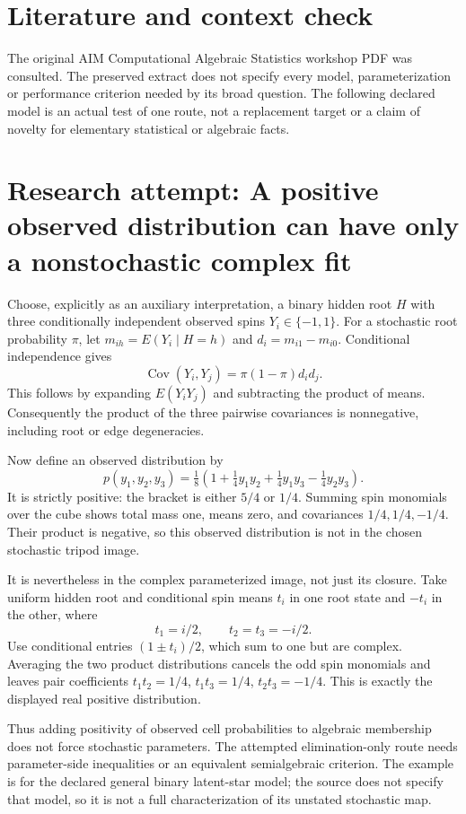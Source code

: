 \documentclass[11pt]{article}
\begin{document}
\section{Literature and context check}
The original AIM Computational Algebraic Statistics
 workshop PDF was consulted. The preserved extract does not specify every model,
 parameterization or performance criterion needed by its broad question. The
 following declared model is an actual test of one route, not a replacement
 target or a claim of novelty for elementary statistical or algebraic facts.
\section{Research attempt: A positive observed distribution can have only a nonstochastic complex fit}
Choose, explicitly as an auxiliary interpretation, a binary hidden root
$H$ with three conditionally independent observed spins $Y_i\in\{-1,1\}$.
For a stochastic root probability $\pi$, let $m_{ih}=E(Y_i\mid H=h)$ and
$d_i=m_{i1}-m_{i0}$. Conditional independence gives
\[
 \operatorname{Cov}(Y_i,Y_j)=\pi(1-\pi)d_id_j.
\]
This follows by expanding $E(Y_iY_j)$ and subtracting the product of means.
Consequently the product of the three pairwise covariances is nonnegative,
including root or edge degeneracies.

Now define an observed distribution by
\[
 p(y_1,y_2,y_3)=\tfrac18\left(1+\tfrac14y_1y_2+
                       \tfrac14y_1y_3-\tfrac14y_2y_3\right).
\]
It is strictly positive: the bracket is either $5/4$ or $1/4$.
Summing spin monomials over the cube shows total mass one, means zero,
and covariances $1/4,1/4,-1/4$. Their product is negative, so this observed
distribution is not in the chosen stochastic tripod image.

It is nevertheless in the complex parameterized image, not just its closure.
Take uniform hidden root and conditional spin means $t_i$ in one root state
and $-t_i$ in the other, where
\[
 t_1=i/2,\qquad t_2=t_3=-i/2.
\]
Use conditional entries $(1\pm t_i)/2$, which sum to one but are complex.
Averaging the two product distributions cancels the odd spin monomials and
leaves pair coefficients $t_1t_2=1/4$, $t_1t_3=1/4$, $t_2t_3=-1/4$.
This is exactly the displayed real positive distribution.

Thus adding positivity of observed cell probabilities to algebraic membership
does not force stochastic parameters. The attempted elimination-only route
needs parameter-side inequalities or an equivalent semialgebraic criterion.
The example is for the declared general binary latent-star model; the source
does not specify that model, so it is not a full characterization of its
unstated stochastic map.
\end{document}
